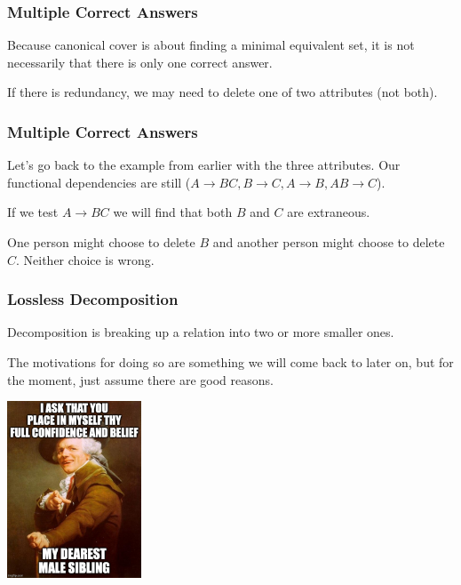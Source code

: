 \begin{frame}
\frametitle{Multiple Correct Answers}

Because canonical cover is about finding a minimal equivalent set, it is not necessarily that there is only one correct answer. 

If there is redundancy, we may need to delete one of two attributes (not both). 

\end{frame}



\begin{frame}
\frametitle{Multiple Correct Answers}

Let's go back to the example from earlier with the three attributes. Our functional dependencies are still ($A \rightarrow BC, B \rightarrow C, A \rightarrow B, AB \rightarrow C$). 

If we test $A \rightarrow BC$ we will find that both $B$ and $C$ are extraneous. 

One person might choose to delete $B$ and another person might choose to delete $C$. Neither choice is wrong.

\end{frame}



\begin{frame}
\frametitle{Lossless Decomposition}

Decomposition is breaking up a relation into two or more smaller ones. 

The motivations for doing so are something we will come back to later on, but for the moment, just assume there are good reasons. 

\begin{center}
	\includegraphics[width=0.3\textwidth]{images/trustme.jpg}
\end{center}

\end{frame}



